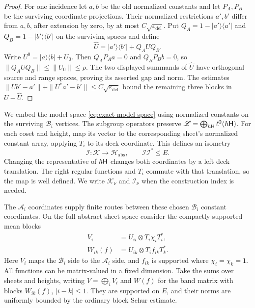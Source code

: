 \begin{proof}
For one incidence let $a,b$ be the old normalized constants and let $P_A,P_B$
be the surviving coordinate projections.  Their normalized restrictions
$a',b'$ differ from $a,b$, after extension by zero, by at most
$C\sqrt{\varepsilon_{\mathrm{del}}}$.  Put
$Q_A=1-|a'\rangle\langle a'|$ and
$Q_B=1-|b'\rangle\langle b'|$ on the surviving spaces and define
\[
 \widehat U=|a'\rangle\langle b'|+Q_AUQ_B.
\]
Write $U^0=|a\rangle\langle b|+U_0$.  Then
$Q_AP_Aa=0$ and $Q_BP_Bb=0$, so $\|Q_AUQ_B\|\le\|U_0\|\le\rho$.
The two displayed summands of $\widehat U$ have orthogonal source and range
spaces, proving its asserted gap and norm.  The estimates
$\|Ub'-a'\|+\|U^*a'-b'\|\le C\sqrt{\varepsilon_{\mathrm{del}}}$
bound the remaining three blocks in $U-\widehat U$.
\end{proof}

We embed the model space \eqref{eq:exact-model-space} using normalized
constants on the surviving $\mathscr B_i$ vertices.  The subgroup operators
preserve $\mathscr L=\bigoplus_{h\mathsf H}\ell^2(h\mathsf H)$.  For each coset and
height, map its vector to the corresponding sheet's normalized constant
array, applying $T_i$ to its deck coordinate.  This defines an isometry
\[
 \mathcal I\colon\mathscr K\longrightarrow\mathscr H_{\mathrm{abs}},
 \qquad \mathcal I\mathcal I^*\le E.
\]
Changing the representative of $h\mathsf H$ changes both coordinates by a left
deck translation.  The right regular functions and $T_i$ commute with that
translation, so the map is well defined.  We write $\mathscr K_\nu$ and
$\mathcal I_\nu$ when the construction index is needed.

The $\mathscr A_i$ coordinates supply finite routes between these chosen
$\mathscr B_i$ constant coordinates.  On the full abstract sheet space
consider the compactly supported mean blocks
\begin{align*}
 V_i&=U_{ii}\otimes T_i\chi_iT_i^*,\\
 W_{ik}(f)&=U_{ik}\otimes T_i f_{ik}T_k^*.
\end{align*}
Here $V_i$ maps the $\mathscr B_i$ side to the $\mathscr A_i$ side, and
$f_{ik}$ is supported where $\chi_i=\chi_k=1$.  All functions can be
matrix-valued in a fixed dimension.  Take the sums over sheets and heights,
writing $V=\bigoplus_i V_i$ and $W(f)$ for the band matrix with blocks
$W_{ik}(f)$, $|i-k|\le1$.  They are supported on $E$, and their norms are
uniformly bounded by the ordinary block Schur estimate.

